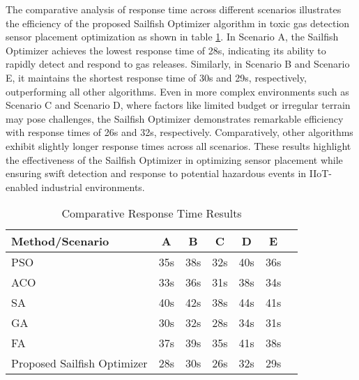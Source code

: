 \documentclass[conference]{IEEEtran}
\begin{document}
The comparative analysis of response time across different scenarios illustrates the efficiency of the proposed Sailfish Optimizer algorithm in toxic gas detection sensor placement optimization as shown in table \ref{tab:response_time_comparison}. In Scenario A, the Sailfish Optimizer achieves the lowest response time of 28s, indicating its ability to rapidly detect and respond to gas releases. Similarly, in Scenario B and Scenario E, it maintains the shortest response time of 30s and 29s, respectively, outperforming all other algorithms. Even in more complex environments such as Scenario C and Scenario D, where factors like limited budget or irregular terrain may pose challenges, the Sailfish Optimizer demonstrates remarkable efficiency with response times of 26s and 32s, respectively. Comparatively, other algorithms exhibit slightly longer response times across all scenarios. These results highlight the effectiveness of the Sailfish Optimizer in optimizing sensor placement while ensuring swift detection and response to potential hazardous events in IIoT-enabled industrial environments.

\begin{table}[htbp]
\centering
\caption{Comparative Response Time Results}
\label{tab:response_time_comparison}
\begin{tabular}{lcccccc}
\toprule
\textbf{Method/Scenario} & \textbf{A} & \textbf{B} & \textbf{C} & \textbf{D} & \textbf{E} \\
\midrule
PSO & 35s & 38s & 32s & 40s & 36s \\
ACO & 33s & 36s & 31s & 38s & 34s \\
SA & 40s & 42s & 38s & 44s & 41s \\
GA & 30s & 32s & 28s & 34s & 31s \\
FA& 37s & 39s & 35s & 41s & 38s \\
Proposed Sailfish Optimizer & 28s & 30s & 26s & 32s & 29s \\
\bottomrule
\end{tabular}
\end{table}
\end{document}
